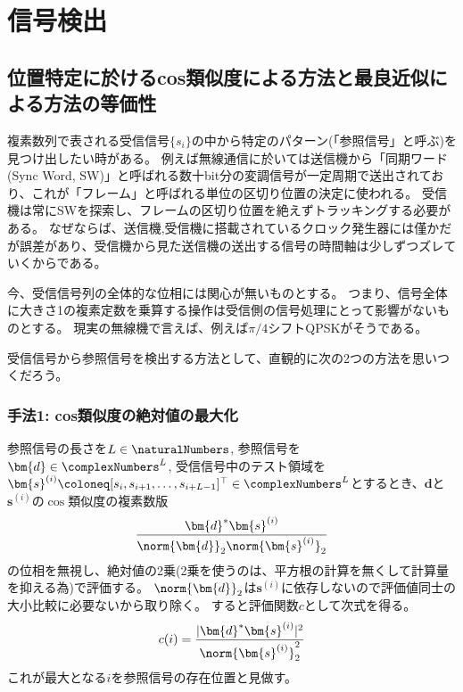 \chapter{信号検出}
    \section{位置特定に於けるcos類似度による方法と最良近似による方法の等価性}
        複素数列で表される受信信号$\{s_i\}$の中から特定のパターン(「参照信号」と呼ぶ)を見つけ出したい時がある。
        例えば無線通信に於いては送信機から「同期ワード (Sync Word, SW)」と呼ばれる数十bit分の変調信号が一定周期で送出されており、これが「フレーム」と呼ばれる単位の区切り位置の決定に使われる。
        受信機は常にSWを探索し、フレームの区切り位置を絶えずトラッキングする必要がある。
        なぜならば、送信機,受信機に搭載されているクロック発生器には僅かだが誤差があり、受信機から見た送信機の送出する信号の時間軸は少しずつズレていくからである。
        \par
        今、受信信号列の全体的な位相には関心が無いものとする。
        つまり、信号全体に大きさ1の複素定数を乗算する操作は受信側の信号処理にとって影響がないものとする。
        現実の無線機で言えば、例えば$\pi/4$シフトQPSKがそうである。
        \par
        受信信号から参照信号を検出する方法として、直観的に次の2つの方法を思いつくだろう。
        \subsection{手法1: cos類似度の絶対値の最大化}
            \label{手法1: cos類似度の絶対値の最大化}
            参照信号の長さを$L\in\naturalNumbers$, 参照信号を$\bm{d} \in \complexNumbers^L$, 受信信号中のテスト領域を$\bm{s}^{(i)} \coloneq [s_i,s_{i+1},\dots,s_{i+L-1}]^\top \in \complexNumbers^L$とするとき、$\bm{d}$と$\bm{s}^{(i)}$の$\cos$類似度の複素数版
            \[ \frac{\bm{d}^*\bm{s}^{(i)}}{\norm{\bm{d}}_2\norm{\bm{s}^{(i)}}_2} \]
            の位相を無視し、絶対値の2乗(2乗を使うのは、平方根の計算を無くして計算量を抑える為)で評価する。
            $\norm{\bm{d}}_2$は$\bm{s}^{(i)}$に依存しないので評価値同士の大小比較に必要ないから取り除く。
            すると評価関数$c$として次式を得る。
            \[ c(i) = \frac{|\bm{d}^*\bm{s}^{(i)}|^2}{\norm{\bm{s}^{(i)}}_2^2} \]
            これが最大となる$i$を参照信号の存在位置と見做す。
